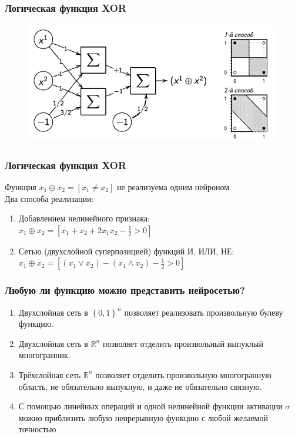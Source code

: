 \documentclass[12pt]{beamer}
\begin{document}
\begin{frame}\frametitle{Логическая функция XOR}

\begin{figure}[htbp]
  \includegraphics[height=150pt, keepaspectratio = true]{images/XOR}   
\end{figure}
\end{frame}

\begin{frame}\frametitle{Логическая функция XOR}
Функция $x_1 \oplus x_2 = [x_1 \neq x_2]$ не реализуема одним нейроном.\\
Два способа реализации:\\
\begin{enumerate}[--]
\item Добавлением нелинейного признака:\\
$x_1 \oplus x_2 = [x_1 + x_2 + 2x_1x_2 - \frac{1}{2} > 0]$
\item Сетью (двухслойной суперпозицией) функций И, ИЛИ, НЕ:\\
$x_1 \oplus x_2 = [(x_1 \vee x_2) - (x_1 \wedge x_2) - \frac{1}{2} > 0]$
\end{enumerate}
\end{frame}

\begin{frame}\frametitle{Любую ли функцию можно представить нейросетью?}
\begin{enumerate}[--]
\item Двухслойная сеть в $\left\{0, 1 \right\}^n$ позволяет реализовать произвольную булеву функцию.
\item Двухслойная сеть в $\mathbb{R}^n$ позволяет отделить произвольный выпуклый многогранник.
\item Трёхслойная сеть $\mathbb{R}^n$ позволяет отделить произвольную многогранную область, не обязательно выпуклую, и даже не обязательно связную.
\item С помощью линейных операций и одной нелинейной функции активации $\sigma$ можно приблизить любую непрерывную функцию с любой желаемой точностью
\end{enumerate}
\end{frame}
\end{document}
